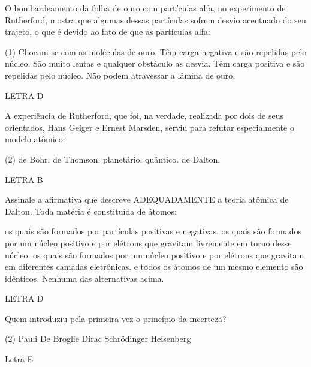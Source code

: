 \documentclass[9qpt]{scrartcl}
\begin{document}
\begin{exercise}[points=1.0]
O bombardeamento da folha de ouro com partículas alfa, no experimento de Rutherford, mostra que algumas dessas partículas sofrem desvio acentuado do seu trajeto, o que é devido ao fato de que as partículas alfa:
\begin{choice}(1)
\choice Chocam-se com as moléculas de ouro.
\choice Têm carga negativa e são repelidas pelo núcleo.
\choice São muito lentas e qualquer obstáculo as desvia.
\choice Têm carga positiva e são repelidas pelo núcleo.
\choice Não podem atravessar a lâmina de ouro.
\end{choice}
\end{exercise}
\begin{solution}
LETRA D
\end{solution}



\begin{exercise}[points=1.0]
A experiência de Rutherford, que foi, na verdade, realizada por dois de seus orientados, Hans Geiger e Ernest Marsden, serviu para refutar especialmente o modelo atômico:
\begin{choice}(2)
\choice de Bohr.
\choice de Thomson.
\choice planetário.
\choice quântico.
\choice de Dalton.
\end{choice}
\end{exercise}
\begin{solution}
LETRA B
\end{solution}

\begin{exercise}[points=1.0]
Assinale a afirmativa que descreve ADEQUADAMENTE a teoria atômica de Dalton. Toda matéria é constituída de átomos:
\begin{choice}
\choice os quais são formados por partículas positivas e negativas.
\choice os quais são formados por um núcleo positivo e por elétrons que gravitam livremente em torno desse núcleo.
\choice os quais são formados por um núcleo positivo e por elétrons que gravitam em diferentes camadas eletrônicas.
\choice e todos os átomos de um mesmo elemento são idênticos.
\choice Nenhuma das alternativas acima.
\end{choice}
\end{exercise}
\begin{solution}
LETRA D
\end{solution}



\begin{exercise}[points=1.0]
Quem introduziu pela primeira vez o princípio da incerteza?

\begin{choice}(2)
\choice Pauli
\choice De Broglie
\choice Dirac
\choice Schrödinger
\choice Heisenberg
\end{choice}
\end{exercise}
\begin{solution}
Letra E
\end{solution}
\end{document}
